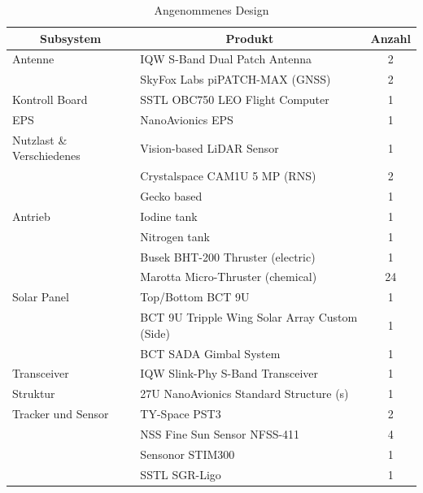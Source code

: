 				\begin{table}[!h]
				\centering
\begin{tabular}{|l|l|c|}
\hline
\multicolumn{1}{|c|}{Subsystem} & \multicolumn{1}{c|}{Produkt}    	            & Anzahl \\ \hline
Antenne                         & IQW S-Band Dual Patch Antenna                 & 2      \\ \hline
                                & SkyFox Labs piPATCH-MAX (GNSS)                & 2      \\ \hline
Kontroll Board                  & SSTL OBC750 LEO Flight Computer               & 1      \\ \hline
EPS                             & NanoAvionics EPS                              & 1      \\ \hline
Nutzlast \& Verschiedenes       & Vision-based LiDAR Sensor                     & 1      \\ \hline
                                & Crystalspace CAM1U 5 MP (RNS)                 & 2      \\ \hline
                                & Gecko based                                   & 1      \\ \hline
Antrieb                         & Iodine tank                                   & 1      \\ \hline
                                & Nitrogen tank                                 & 1      \\ \hline
                                & Busek BHT-200 Thruster (electric)             & 1      \\ \hline
                                & Marotta Micro-Thruster (chemical)             & 24     \\ \hline
Solar Panel                     & Top/Bottom BCT 9U                             & 1      \\ \hline
                                & BCT 9U Tripple Wing Solar Array Custom (Side) & 1      \\ \hline
                                & BCT SADA Gimbal System                        & 1      \\ \hline
Transceiver                     & IQW Slink-Phy S-Band Transceiver              & 1      \\ \hline
Struktur                        & 27U NanoAvionics Standard Structure (s)       & 1      \\ \hline
Tracker und Sensor               & TY-Space PST3                                 & 2      \\ \hline
                                & NSS Fine Sun Sensor NFSS-411                  & 4      \\ \hline
                                & Sensonor STIM300                              & 1      \\ \hline
                                & SSTL SGR-Ligo                                 & 1      \\ \hline
\end{tabular}
\caption{Angenommenes Design \cite{Lettau.}}
\label{tab:cubesatdesign}
\end{table}

